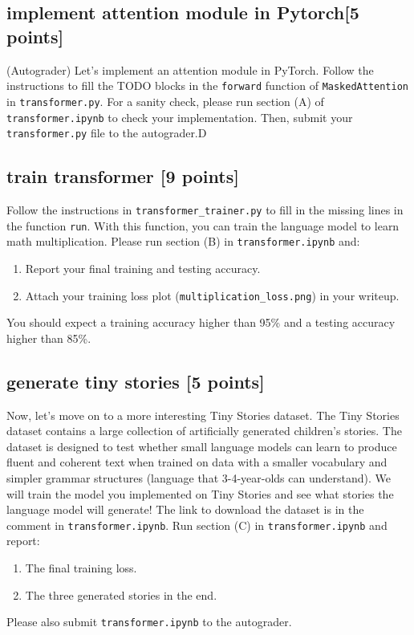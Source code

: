 \documentclass[lang=cn,11pt]{elegantbook}
\begin{document}
\subsection*{implement attention module in Pytorch[5 points]}
(Autograder) Let's implement an attention module in PyTorch. Follow the instructions to fill the TODO blocks in the \texttt{forward} function of \texttt{MaskedAttention} in \texttt{transformer.py}. For a sanity check, please run section (A) of \texttt{transformer.ipynb} to check your implementation. Then, submit your \texttt{transformer.py} file to the autograder.D

\subsection*{train transformer [9 points]}
Follow the instructions in \texttt{transformer\_trainer.py} to fill in the missing lines in the function \texttt{run}. With this function, you can train the language model to learn math multiplication. Please run section (B) in \texttt{transformer.ipynb} and:
\begin{enumerate}
    \item Report your final training and testing accuracy.
    \item Attach your training loss plot (\texttt{multiplication\_loss.png}) in your writeup.
\end{enumerate}
You should expect a training accuracy higher than 95\% and a testing accuracy higher than 85\%.

\subsection*{generate tiny stories [5 points]}
Now, let's move on to a more interesting Tiny Stories dataset. The Tiny Stories dataset contains a large collection of artificially generated children's stories. The dataset is designed to test whether small language models can learn to produce fluent and coherent text when trained on data with a smaller vocabulary and simpler grammar structures (language that 3-4-year-olds can understand). We will train the model you implemented on Tiny Stories and see what stories the language model will generate! 
The link to download the dataset is in the comment in \texttt{transformer.ipynb}. Run section (C) in \texttt{transformer.ipynb} and report:
\begin{enumerate}
    \item The final training loss.
    \item The three generated stories in the end.
\end{enumerate}
Please also submit \texttt{transformer.ipynb} to the autograder.





\end{document}
